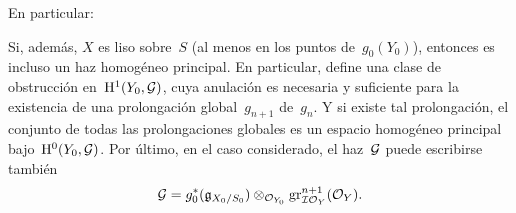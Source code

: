 En particular:

\begin{corollaire}
\label{III.5.4}
Si, además, $X$ es liso sobre~$S$ (al menos en los puntos de~$g_0(Y_0)$), entonces
es incluso un haz homogéneo principal.
{\enlargethispage{.5cm}}%
En particular, define una clase de obstrucción en~$\H^1(Y_0,\cal{G})$, cuya anulación es necesaria y suficiente para la existencia de una prolongación global~$g_{n+1}$ de~$g_n$. Y si existe tal prolongación, el conjunto de todas las prolongaciones globales es un espacio homogéneo principal bajo~$\H^0(Y_0,\cal{G})$. Por último, en el caso considerado, el haz~$\cal{G}$ puede escribirse también
\begin{equation*}
\cal{G}=g_0^*(\goth{g}_{X_0/S_0})\otimes_{\cal{O}_{Y_0}}
\gr_{\cal{IO}_Y}^{n+1}(\cal{O}_Y).
\end{equation*}
\end{corollaire}
